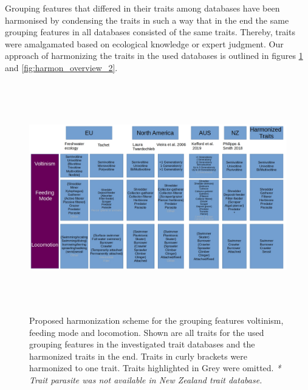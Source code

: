 \documentclass{article}
\begin{document}
Grouping features that differed in their traits among databases have been harmonised by condensing the traits in such a way
that in the end the same grouping features in all databases consisted of the same traits.  
Thereby, traits were amalgamated based on ecological knowledge or expert judgment. %
Our approach of harmonizing the traits in the used databases is outlined in figures 
\ref{fig:harmon_overview_1} and \ref{fig:harmon_overview_2}. 

\begin{figure}[H]
   \centering
   \includegraphics[width=16.5cm, height=10cm]{trait_overview1.jpg}
   \caption{Proposed harmonization scheme for the grouping features
   voltinism, feeding mode and locomotion. Shown are all traits for the 
   used grouping features in the investigated trait databases and 
   the harmonized traits in the end. Traits in curly brackets were 
   harmonized to one trait. Traits highlighted in Grey were omitted. \newline
   \textit{* Trait parasite was not available in New Zealand trait database.}
   }
   \label{fig:harmon_overview_1}
\end{figure}
\end{document}

